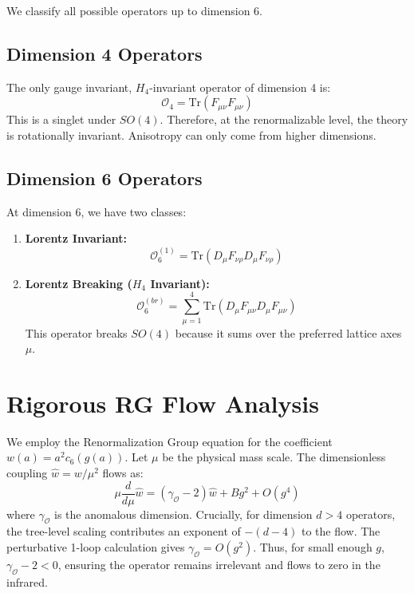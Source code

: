 We classify all possible operators up to dimension 6.

\subsection{Dimension 4 Operators}
The only gauge invariant, $H_4$-invariant operator of dimension 4 is:
\begin{equation}
\mathcal{O}_4 = \text{Tr}(F_{\mu\nu} F_{\mu\nu})
\end{equation}
This is a singlet under $SO(4)$. Therefore, at the renormalizable level, the theory is rotationally invariant. Anisotropy can only come from higher dimensions.

\subsection{Dimension 6 Operators}
At dimension 6, we have two classes:
\begin{enumerate}
    \item \textbf{Lorentz Invariant:}
    \begin{equation}
    \mathcal{O}_6^{(1)} = \text{Tr}(D_\mu F_{\nu\rho} D_\mu F_{\nu\rho})
    \end{equation}
    
    \item \textbf{Lorentz Breaking ($H_4$ Invariant):}
    \begin{equation}
    \mathcal{O}_6^{(br)} = \sum_{\mu=1}^4 \text{Tr}(D_\mu F_{\mu\nu} D_\mu F_{\mu\nu})
    \end{equation}
    This operator breaks $SO(4)$ because it sums over the preferred lattice axes $\mu$.
\end{enumerate}

\section{Rigorous RG Flow Analysis}

We employ the Renormalization Group equation for the coefficient $w(a) = a^2 c_6(g(a))$.
Let $\mu$ be the physical mass scale. The dimensionless coupling $\hat{w} = w / \mu^2$ flows as:
\begin{equation}
\mu \frac{d}{d\mu} \hat{w} = (\gamma_{\mathcal{O}} - 2) \hat{w} + B g^2 + O(g^4)
\end{equation}
where $\gamma_{\mathcal{O}}$ is the anomalous dimension.
Crucially, for dimension $d>4$ operators, the tree-level scaling contributes an exponent of $- (d-4)$ to the flow. The perturbative 1-loop calculation gives $\gamma_{\mathcal{O}} = O(g^2)$. Thus, for small enough $g$, $\gamma_{\mathcal{O}} - 2 < 0$, ensuring the operator remains irrelevant and flows to zero in the infrared.

